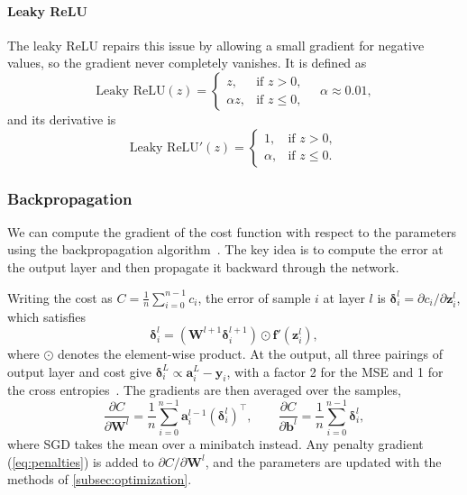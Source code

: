 \paragraph{Leaky ReLU} The leaky ReLU repairs this issue by allowing a small gradient for negative values,
so the gradient never completely vanishes. It is defined as
\begin{equation*}
    \text{Leaky ReLU}(z) =
    \begin{cases}
        z, & \text{if } z > 0, \\
        \alpha z, & \text{if } z \leq 0,
    \end{cases}
    \quad \alpha \approx 0.01,
\end{equation*}
and its derivative is
\begin{equation*}
    \text{Leaky ReLU}'(z) =
    \begin{cases}
        1, & \text{if } z > 0, \\
        \alpha, & \text{if } z \leq 0.
    \end{cases}
\end{equation*}

\subsubsection{Backpropagation}

We can compute the gradient of the cost function with respect to the parameters using
the backpropagation algorithm~\cite{rumelhart_1986}. The key idea is to compute the
error at the output layer and then propagate it backward through the network.

Writing the cost as $C = \frac{1}{n}\sum_{i=0}^{n-1} c_i$, the error of sample $i$ at layer $l$ is
$\bm{\delta}_i^l = \partial c_i / \partial \bm{z}_i^l$, which satisfies
\begin{equation*}
    \bm{\delta}_i^l = (\bm{W}^{l+1} \bm{\delta}_i^{l+1}) \odot \bm{f}'(\bm{z}_i^l),
\end{equation*}
where $\odot$ denotes the element-wise product. At the output, all three pairings of
output layer and cost give
$\bm{\delta}_i^L \propto \bm{a}_i^L - \bm{y}_i$, with a factor 2 for the MSE and 1 for the
cross entropies~\cite{hjorth-jensen_2026}. The gradients are then averaged over the samples,
\begin{equation*}
    \frac{\partial C}{\partial \bm{W}^l} = \frac{1}{n}\sum_{i=0}^{n-1} \bm{a}_i^{l-1}
    (\bm{\delta}_i^l)^\top,
    \qquad
    \frac{\partial C}{\partial \bm{b}^l} = \frac{1}{n}\sum_{i=0}^{n-1} \bm{\delta}_i^l,
\end{equation*}
where SGD takes the mean over a minibatch instead. Any penalty gradient (\cref{eq:penalties}) is
added to $\partial C / \partial \bm{W}^l$, and the parameters are updated with the methods of
\cref{subsec:optimization}.


